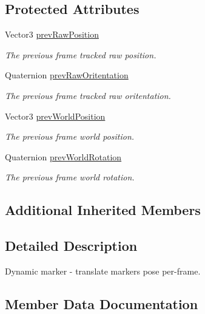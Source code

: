 \subsection*{Protected Attributes}
\begin{DoxyCompactItemize}
\item 
Vector3 \mbox{\hyperlink{class_ximmerse_1_1_slide_in_s_d_k_1_1_dynamic_marker_ab5d6eee6fe98e3348284efe047fe7b02}{prev\+Raw\+Position}}
\begin{DoxyCompactList}\small\item\em The previous frame tracked raw position. \end{DoxyCompactList}\item 
Quaternion \mbox{\hyperlink{class_ximmerse_1_1_slide_in_s_d_k_1_1_dynamic_marker_ae024af761d7e9732b66ba9fe29a97127}{prev\+Raw\+Oritentation}}
\begin{DoxyCompactList}\small\item\em The previous frame tracked raw oritentation. \end{DoxyCompactList}\item 
Vector3 \mbox{\hyperlink{class_ximmerse_1_1_slide_in_s_d_k_1_1_dynamic_marker_aa85f1c20fe79e66aa9e4a87e1fd03115}{prev\+World\+Position}}
\begin{DoxyCompactList}\small\item\em The previous frame world position. \end{DoxyCompactList}\item 
Quaternion \mbox{\hyperlink{class_ximmerse_1_1_slide_in_s_d_k_1_1_dynamic_marker_a9bffffd77f8b8eac9fac3070053e4903}{prev\+World\+Rotation}}
\begin{DoxyCompactList}\small\item\em The previous frame world rotation. \end{DoxyCompactList}\end{DoxyCompactItemize}
\subsection*{Additional Inherited Members}


\subsection{Detailed Description}
Dynamic marker -\/ translate marker\textquotesingle{}s pose per-\/frame. ~\newline




\subsection{Member Data Documentation}
\mbox{\label{class_ximmerse_1_1_slide_in_s_d_k_1_1_dynamic_marker_ae024af761d7e9732b66ba9fe29a97127}} 
